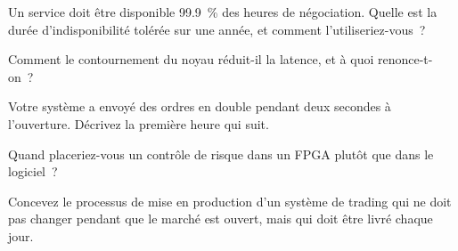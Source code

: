 \begin{interviewq}\label{iq:in:software-engineer:2}
Un service doit être disponible 99.9~\% des heures de négociation. Quelle est la durée d'indisponibilité tolérée sur une année, et comment l'utiliseriez-vous~?
\end{interviewq}

\begin{interviewq}\label{iq:in:software-engineer:3}
Comment le contournement du noyau réduit-il la latence, et à quoi renonce-t-on~?
\end{interviewq}

\begin{interviewq}\label{iq:in:software-engineer:4}
Votre système a envoyé des ordres en double pendant deux secondes à l'ouverture. Décrivez la première heure qui suit.
\end{interviewq}

\begin{interviewq}\label{iq:in:software-engineer:5}
Quand placeriez-vous un contrôle de risque dans un FPGA plutôt que dans le logiciel~?
\end{interviewq}

\begin{interviewq}\label{iq:in:software-engineer:6}
Concevez le processus de mise en production d'un système de trading qui ne doit pas changer pendant que le marché est ouvert, mais qui doit être livré chaque jour.
\end{interviewq}
